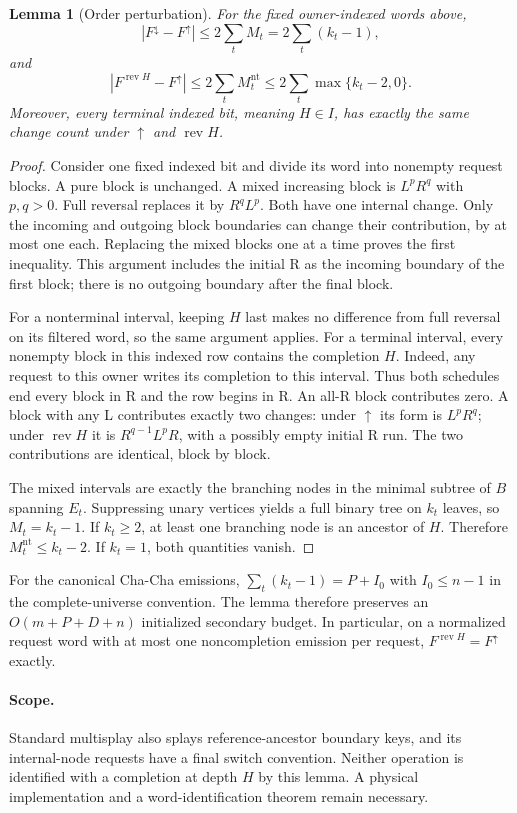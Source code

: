 \documentclass[11pt]{article}
\newtheorem{lemma}{Lemma}
\begin{document}
\begin{lemma}[Order perturbation]
For the fixed owner-indexed words above,
\[
 |F^\downarrow-F^\uparrow|\le 2\sum_t M_t
       =2\sum_t(k_t-1),
\]
and
\[
 |F^{\operatorname{rev}H}-F^\uparrow|
   \le 2\sum_t M_t^{\mathrm{nt}}
   \le 2\sum_t\max\{k_t-2,0\}.
\]
Moreover, every terminal indexed bit, meaning $H\in I$, has exactly the
same change count under $\uparrow$ and $\operatorname{rev}H$.
\end{lemma}
\begin{proof}
Consider one fixed indexed bit and divide its word into nonempty request
blocks. A pure block is unchanged. A mixed increasing block is
$L^pR^q$ with $p,q>0$. Full reversal replaces it by $R^qL^p$.
Both have one internal change. Only the incoming and outgoing block
boundaries can change their contribution, by at most one each. Replacing
the mixed blocks one at a time proves the first inequality. This argument
includes the initial R as the incoming boundary of the first block;
there is no outgoing boundary after the final block.

For a nonterminal interval, keeping $H$ last makes no difference from
full reversal on its filtered word, so the same argument applies.
For a terminal interval, every nonempty block in this indexed row contains
the completion $H$. Indeed, any request to this owner writes its completion
to this interval. Thus both schedules end every block in R and the row
begins in R. An all-R block contributes zero. A block with any L contributes
exactly two changes: under $\uparrow$ its form is $L^pR^q$; under
$\operatorname{rev}H$ it is $R^{q-1}L^pR$, with a possibly empty initial
R run. The two contributions are identical, block by block.

The mixed intervals are exactly the branching nodes in the minimal
subtree of $B$ spanning $E_t$. Suppressing unary vertices yields a full
binary tree on $k_t$ leaves, so $M_t=k_t-1$. If $k_t\ge2$, at least one
branching node is an ancestor of $H$. Therefore
$M_t^{\mathrm{nt}}\le k_t-2$. If $k_t=1$, both quantities vanish.
\end{proof}

For the canonical Cha-Cha emissions,
$\sum_t(k_t-1)=P+I_0$ with $I_0\le n-1$ in the complete-universe
convention. The lemma therefore preserves an $O(m+P+D+n)$ initialized
secondary budget. In particular, on a normalized request word with at
most one noncompletion emission per request,
$F^{\operatorname{rev}H}=F^\uparrow$ exactly.

\paragraph{Scope.}
Standard multisplay also splays reference-ancestor boundary keys, and its
internal-node requests have a final switch convention. Neither operation
is identified with a completion at depth $H$ by this lemma. A physical
implementation and a word-identification theorem remain necessary.
\end{document}
